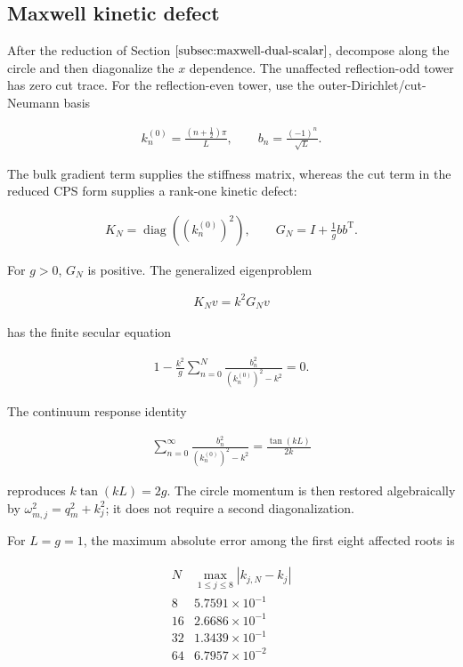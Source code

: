 \subsection{Maxwell kinetic defect}\label{subsec:numerics-maxwell}

After the reduction of Section $\ref{subsec:maxwell-dual-scalar}$, decompose along the circle and then diagonalize the $x$ dependence. The unaffected reflection-odd tower has zero cut trace. For the reflection-even tower, use the outer-Dirichlet/cut-Neumann basis

\begin{align}
k_n^{(0)}=\frac{(n+\frac12)\pi}{L},
\qquad
b_n=\frac{(-1)^n}{\sqrt L}.
\end{align}

The bulk gradient term supplies the stiffness matrix, whereas the cut term in the reduced CPS form supplies a rank-one kinetic defect:

\begin{align}
K_N=\operatorname{diag}\!\left((k_n^{(0)})^2\right),
\qquad
G_N=I+\frac1g bb^{\mathrm T}.
\end{align}

For $g>0$, $G_N$ is positive. The generalized eigenproblem

\begin{align}
K_Nv=k^2G_Nv
\end{align}

has the finite secular equation

\begin{align}
1-\frac{k^2}{g}
\sum_{n=0}^{N}\frac{b_n^2}{(k_n^{(0)})^2-k^2}=0.
\end{align}

The continuum response identity

\begin{align}
\sum_{n=0}^{\infty}\frac{b_n^2}{(k_n^{(0)})^2-k^2}
=\frac{\tan(kL)}{2k}
\end{align}

reproduces $k\tan(kL)=2g$. The circle momentum is then restored algebraically by $\omega_{m,j}^2=q_m^2+k_j^2$; it does not require a second diagonalization.

For $L=g=1$, the maximum absolute error among the first eight affected roots is

\begin{align}
\begin{array}{c|c}
N & \max_{1\leq j\leq8}|k_{j,N}-k_j| \\ \hline
8  & 5.7591\times10^{-1} \\
16 & 2.6686\times10^{-1} \\
32 & 1.3439\times10^{-1} \\
64 & 6.7957\times10^{-2}
\end{array}
\end{align}


